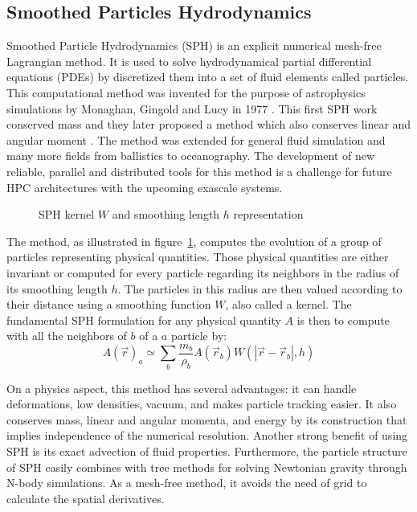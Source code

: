 \subsection{Smoothed Particles Hydrodynamics}
\label{sec:intro_sph}
Smoothed Particle Hydrodynamics (SPH) is an explicit numerical mesh-free Lagrangian method.
It is used to solve hydrodynamical partial differential equations (PDEs) by discretized them into a set of fluid elements called particles. 
This computational method was invented for the purpose of astrophysics simulations by Monaghan, Gingold and Lucy in 1977 \cite{lucy1977numerical,gingold1977smoothed}. 
This first SPH work conserved mass and they later proposed a method which also conserves linear and angular moment \cite{gingold1982kernel}. 
The method was extended for general fluid simulation and many more fields from ballistics to oceanography.
The development of new reliable, parallel and distributed tools for this method is a challenge for future HPC architectures with the upcoming exascale systems.

%
\begin{figure}
\centering

\caption{SPH kernel $W$ and smoothing length $h$ representation}
\label{fig:sph_base}
\end{figure}
%
The method, as illustrated in figure~\ref{fig:sph_base}, computes the evolution of a group of particles representing physical quantities.
Those physical quantities are either invariant or computed for every particle regarding its neighbors in the radius of its smoothing length $h$. 
The particles in this radius are then valued according to their distance using a smoothing function $W$, also called a kernel. 
The fundamental SPH formulation for any physical quantity $A$ is then to compute with all the neighbors of $b$ of a $a$ particle by:
\begin{equation}
A(\vec{r})_a \simeq \sum_b \frac{m_b}{\rho_b} A(\vec{r}_b) W ( |\vec{r}-\vec{r}_b|,h)
\end{equation}

On a physics aspect, this method has several advantages:
it can handle deformations, low densities, vacuum, and makes particle tracking easier. 
It also conserves mass, linear and angular momenta, and energy by its construction that implies independence of the numerical resolution. 
Another strong benefit of using SPH is its exact advection of fluid properties. 
Furthermore, the particle structure of SPH easily combines with tree methods for solving Newtonian gravity through N-body simulations.
As a mesh-free method, it avoids the need of grid to calculate the spatial derivatives. 

